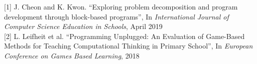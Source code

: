 [1] J. Cheon and K. Kwon. “Exploring problem decomposition and program
development through block-based programs”, In \textit{International Journal of
Computer Science Education in Schools}, April 2019\\

[2] L. Leifheit et al. “Programming Unplugged: An Evaluation of Game-Based
Methods for Teaching Computational Thinking in Primary School”, In
\textit{European Conference on Games Based Learning}, 2018
